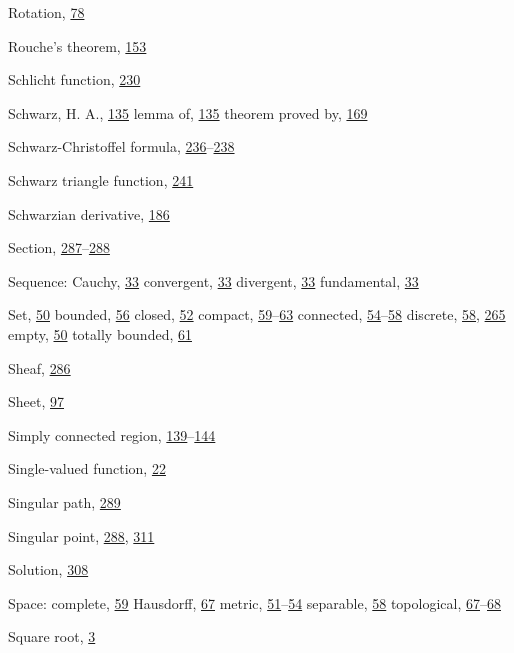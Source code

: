 \begin{theindex}
\item Rotation, \hyperlink{orig-p78}{78}
\item Rouche's theorem, \hyperlink{orig-p153}{153}
\item Schlicht function, \hyperlink{orig-p230}{230}
\item Schwarz, H. A., \hyperlink{orig-p135}{135}
\subitem lemma of, \hyperlink{orig-p135}{135}
\subitem theorem proved by, \hyperlink{orig-p169}{169}
\item Schwarz-Christoffel formula, \hyperlink{orig-p236}{236}--\hyperlink{orig-p238}{238}
\item Schwarz triangle function, \hyperlink{orig-p241}{241}
\item Schwarzian derivative, \hyperlink{orig-p186}{186}
\item Section, \hyperlink{orig-p287}{287}--\hyperlink{orig-p288}{288}
\item Sequence:
\subitem Cauchy, \hyperlink{orig-p33}{33}
\subitem convergent, \hyperlink{orig-p33}{33}
\subitem divergent, \hyperlink{orig-p33}{33}
\subitem fundamental, \hyperlink{orig-p33}{33}
\item Set, \hyperlink{orig-p50}{50}
\subitem bounded, \hyperlink{orig-p56}{56}
\subitem closed, \hyperlink{orig-p52}{52}
\subitem compact, \hyperlink{orig-p59}{59}--\hyperlink{orig-p63}{63}
\subitem connected, \hyperlink{orig-p54}{54}--\hyperlink{orig-p58}{58}
\subitem discrete, \hyperlink{orig-p58}{58}, \hyperlink{orig-p265}{265}
\subitem empty, \hyperlink{orig-p50}{50}
\subitem totally bounded, \hyperlink{orig-p61}{61}
\item Sheaf, \hyperlink{orig-p286}{286}
\item Sheet, \hyperlink{orig-p97}{97}
\item Simply connected region, \hyperlink{orig-p139}{139}--\hyperlink{orig-p144}{144}
\item Single-valued function, \hyperlink{orig-p22}{22}
\item Singular path, \hyperlink{orig-p289}{289}
\item Singular point, \hyperlink{orig-p288}{288}, \hyperlink{orig-p311}{311}
\item Solution, \hyperlink{orig-p308}{308}
\item Space:
\subitem complete, \hyperlink{orig-p59}{59}
\subitem Hausdorff, \hyperlink{orig-p67}{67}
\subitem metric, \hyperlink{orig-p51}{51}--\hyperlink{orig-p54}{54}
\subitem separable, \hyperlink{orig-p58}{58}
\subitem topological, \hyperlink{orig-p67}{67}--\hyperlink{orig-p68}{68}
\item Square root, \hyperlink{orig-p3}{3}

\end{theindex}
